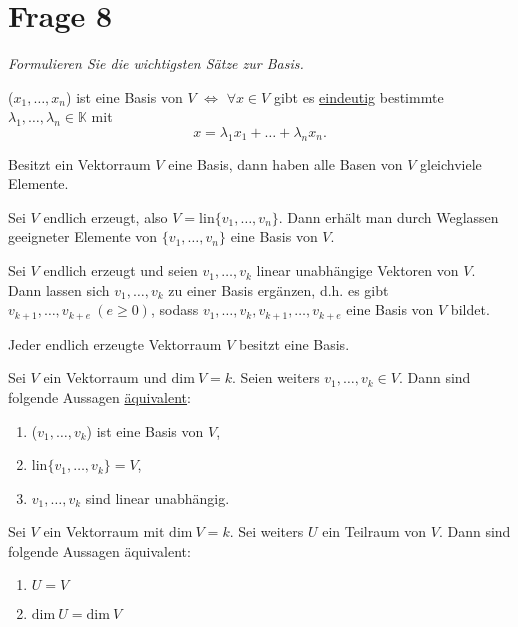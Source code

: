\section{Frage 8}
\textit{Formulieren Sie die wichtigsten Sätze zur Basis.}

\begin{theorem}
    ($x_1,\dots,x_n$) ist eine Basis von $V$ $\Longleftrightarrow$ 
    $\forall x \in V$ gibt es \underline{eindeutig} bestimmte 
    $\lambda_1,\dots,\lambda_n\in\mathbb{K}$ mit 
    \[
        x = \lambda_1 x_1 + \dots + \lambda_n x_n    
    .\]
\end{theorem}
\begin{theorem}
    Besitzt ein Vektorraum $V$ eine Basis, dann haben alle Basen von $V$
    gleichviele Elemente.
\end{theorem}
\begin{theorem}[Basisauswahlsatz]
    Sei $V$ endlich erzeugt, also $V=\mathrm{lin}\{v_1,\dots,v_n\}$.
    Dann erhält man durch Weglassen geeigneter Elemente von 
    $\{v_1,\dots,v_n\}$ eine Basis von $V$.
\end{theorem}
\begin{theorem}[Basisergänzungssatz]
    Sei $V$ endlich erzeugt und seien $v_1,\dots,v_k$ linear unabhängige
    Vektoren von $V$.\\
    Dann lassen sich $v_1,\dots,v_k$ zu einer Basis ergänzen, d.h. es gibt\\ 
    $v_{k+1},\dots,v_{k+e}\ (e\geq 0)$, sodass $v_1,\dots,v_k,v_{k+1},\dots,v_{k+e}$
    eine Basis von $V$ bildet.
\end{theorem}
\begin{corollary}
    Jeder endlich erzeugte Vektorraum $V$ besitzt eine Basis.
\end{corollary}
\begin{corollary}
    Sei $V$ ein Vektorraum und $\mathrm{dim}\ V=k$. Seien weiters $v_1,\dots,v_k\in V$.
    Dann sind folgende Aussagen \underline{äquivalent}:
    \begin{enumerate}
        \item ($v_1,\dots,v_k$) ist eine Basis von $V$,
        \item $\mathrm{lin}\{v_1,\dots,v_k\} = V$,
        \item $v_1,\dots,v_k$ sind linear unabhängig.
    \end{enumerate}
\end{corollary}
\begin{corollary}
    Sei $V$ ein Vektorraum mit $\mathrm{dim}\ V=k$. Sei weiters $U$ ein Teilraum
    von $V$. Dann sind folgende Aussagen äquivalent:
    \begin{enumerate}
        \item $U=V$
        \item $\mathrm{dim}\ U=\mathrm{dim}\ V$
    \end{enumerate}
\end{corollary}